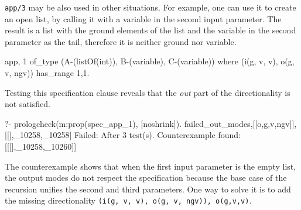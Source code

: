 \documentclass[runningheads,a4paper]{../../PaperStyles/llncs}
\newcommand{\yap}[1]{\lstinline[style=yap]{#1}}
\begin{document}
\yap{app/3} %
may be %
also
used in other situations.
%
For example, one can use it to create an open list, by %
calling it with a variable in the second input parameter.
%
The result is a list with the ground elements of the list and the
variable in the second parameter as the tail, therefore it is neither ground nor
variable.
%
\begin{yapcode}
 {app, 1} of_type (A-(listOf(int)), B-(variable), C-(variable))
   where (i(g, v, v), o(g, v, ngv))  has_range {1,1}.
\end{yapcode}
%
Testing this specification clause reveals that the \emph{out} part of
the directionality is not satisfied.
\begin{yapcode}
  ?- prologcheck(m:prop(spec_app_1), [noshrink]).
 {failed_out_modes,[[o,g,v,ngv]], [[],_10258,_10258]}
 Failed: After 3 test(s).
 Counterexample found: [[[],_10258,_10260]] 
\end{yapcode}
%
The counterexample shows that when the first input parameter is the empty
list, %
the output modes do not respect %
the specification %
because
the base case of the recursion
unifies the second and third parameters.
%
One way to solve it 
is to add the missing directionality \yap{(i(g, v, v), o(g, v, ngv)), o(g,v,v)}.
%


\end{document}
